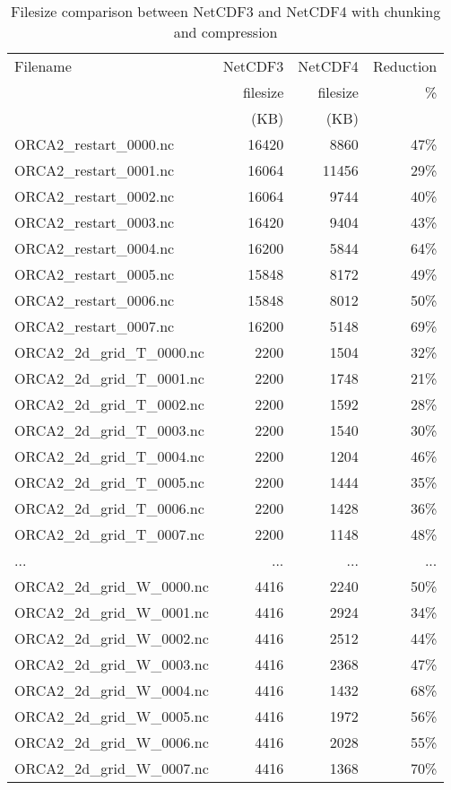\documentclass[../main/NEMO_manual]{subfiles}
\begin{document}
\begin{table}
  \centering
  \begin{tabular}{lrrr}
    Filename                    & NetCDF3	& NetCDF4  & Reduction \\
                                & filesize	& filesize & \%        \\
                                & (KB)		& (KB)	  &           \\
    ORCA2\_restart\_0000.nc     & 16420 	& 8860 	  & 47\%      \\
    ORCA2\_restart\_0001.nc     & 16064 	& 11456    & 29\%      \\
    ORCA2\_restart\_0002.nc     & 16064		& 9744	  & 40\%      \\
    ORCA2\_restart\_0003.nc     & 16420		& 9404	  & 43\%      \\
    ORCA2\_restart\_0004.nc     & 16200 	& 5844	  & 64\%      \\
    ORCA2\_restart\_0005.nc     & 15848 	& 8172	  & 49\%      \\
    ORCA2\_restart\_0006.nc     & 15848 	& 8012 	  & 50\%      \\
    ORCA2\_restart\_0007.nc     & 16200 	& 5148 	  & 69\%      \\
    ORCA2\_2d\_grid\_T\_0000.nc & 2200 		& 1504	  & 32\%      \\
    ORCA2\_2d\_grid\_T\_0001.nc & 2200 		& 1748	  & 21\%      \\
    ORCA2\_2d\_grid\_T\_0002.nc & 2200 		& 1592	  & 28\%      \\
    ORCA2\_2d\_grid\_T\_0003.nc & 2200 		& 1540	  & 30\%      \\
    ORCA2\_2d\_grid\_T\_0004.nc & 2200 		& 1204	  & 46\%      \\
    ORCA2\_2d\_grid\_T\_0005.nc & 2200 		& 1444	  & 35\%      \\
    ORCA2\_2d\_grid\_T\_0006.nc & 2200 		& 1428	  & 36\%      \\
    ORCA2\_2d\_grid\_T\_0007.nc & 2200		& 1148	  & 48\%      \\
    ...                         & ...		& ...      & ...       \\
    ORCA2\_2d\_grid\_W\_0000.nc & 4416		& 2240	  & 50\%      \\
    ORCA2\_2d\_grid\_W\_0001.nc & 4416		& 2924	  & 34\%      \\
    ORCA2\_2d\_grid\_W\_0002.nc & 4416		& 2512	  & 44\%      \\
    ORCA2\_2d\_grid\_W\_0003.nc & 4416		& 2368	  & 47\%      \\
    ORCA2\_2d\_grid\_W\_0004.nc & 4416		& 1432	  & 68\%      \\
    ORCA2\_2d\_grid\_W\_0005.nc & 4416		& 1972	  & 56\%      \\
    ORCA2\_2d\_grid\_W\_0006.nc & 4416		& 2028	  & 55\%      \\
    ORCA2\_2d\_grid\_W\_0007.nc & 4416		& 1368	  & 70\%      \\
  \end{tabular}
  \caption{Filesize comparison between NetCDF3 and NetCDF4 with chunking and compression}
  \label{tab:DIA_NC4}
\end{table}
\end{document}
